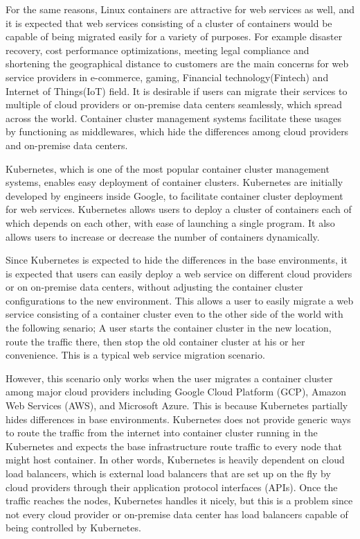 For the same reasons, Linux containers are attractive for web services as well, and it is expected that web services consisting of a cluster of containers would be capable of being migrated easily for a variety of purposes.
For example disaster recovery, cost performance optimizations, meeting legal compliance and shortening the geographical distance to customers are the main concerns for web service providers in e-commerce, gaming, Financial technology(Fintech) and Internet of Things(IoT) field.
%
It is desirable if users can migrate their services to multiple of cloud providers or on-premise data centers seamlessly, which spread across the world.
Container cluster management systems facilitate these usages by functioning as middlewares, which hide the differences among cloud providers and on-premise data centers.

Kubernetes\cite{K8s2017}, which is one of the most popular container cluster management systems, enables easy deployment of container clusters.
Kubernetes are initially developed by engineers inside Google, to facilitate container cluster deployment for web services.
Kubernetes allows users to deploy a cluster of containers each of which depends on each other, with ease of launching a single program.
It also allows users to increase or decrease the number of containers dynamically.

Since Kubernetes is expected to hide the differences in the base environments, it is expected that users can easily deploy a web service on different cloud providers or on on-premise data centers, without adjusting the container cluster configurations to the new environment. 
This allows a user to easily migrate a web service consisting of a container cluster even to the other side of the world with the following senario; 
A user starts the container cluster in the new location, route the traffic there, then stop the old container cluster at his or her convenience.
This is a typical web service migration scenario.

However, this scenario only works when the user migrates a container cluster among major cloud providers including Google Cloud Platform (GCP), Amazon Web Services (AWS), and Microsoft Azure.
This is because Kubernetes partially hides differences in base environments.
Kubernetes does not provide generic ways to route the traffic from the internet into container cluster running in the Kubernetes and expects the base infrastructure route traffic to every node that might host container.
In other words, Kubernetes is heavily dependent on cloud load balancers, which is external load balancers that are set up on the fly by cloud providers through their application protocol interfaces (APIs).
Once the traffic reaches the nodes, Kubernetes handles it nicely, but this is a problem since not every cloud provider or on-premise data center has load balancers capable of being controlled by Kubernetes.

